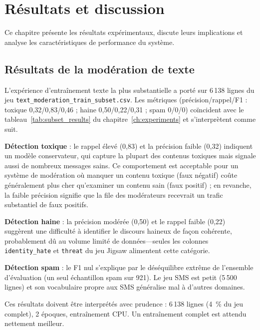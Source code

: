 \chapter{Résultats et discussion}
\label{ch:results}

Ce chapitre présente les résultats expérimentaux, discute leurs implications et analyse les caractéristiques de performance du système.

\section{Résultats de la modération de texte}

L'expérience d'entraînement texte la plus substantielle a porté sur 6\,138 lignes du jeu \texttt{text\_moderation\_train\_subset.csv}. Les métriques (précision/rappel/F1 : toxique 0,32/0,83/0,46 ; haine 0,50/0,22/0,31 ; spam 0/0/0) coïncident avec le tableau~\ref{tab:subset_results} du chapitre~\ref{ch:experiments} et s'interprètent comme suit.

\textbf{Détection toxique} : le rappel élevé (0,83) et la précision faible (0,32) indiquent un modèle conservateur, qui capture la plupart des contenus toxiques mais signale aussi de nombreux messages sains. Ce comportement est acceptable pour un système de modération où manquer un contenu toxique (faux négatif) coûte généralement plus cher qu'examiner un contenu sain (faux positif) ; en revanche, la faible précision signifie que la file des modérateurs recevrait un trafic substantiel de faux positifs.

\textbf{Détection haine} : la précision modérée (0,50) et le rappel faible (0,22) suggèrent une difficulté à identifier le discours haineux de façon cohérente, probablement dû au volume limité de données---seules les colonnes \texttt{identity\_hate} et \texttt{threat} du jeu Jigsaw alimentent cette catégorie.

\textbf{Détection spam} : le F1 nul s'explique par le déséquilibre extrême de l'ensemble d'évaluation (un seul échantillon spam sur 921). Le jeu SMS est petit (5\,500 lignes) et son vocabulaire propre aux SMS généralise mal à d'autres domaines.

Ces résultats doivent être interprétés avec prudence : 6\,138 lignes (4~\% du jeu complet), 2 époques, entraînement CPU. Un entraînement complet est attendu nettement meilleur.


